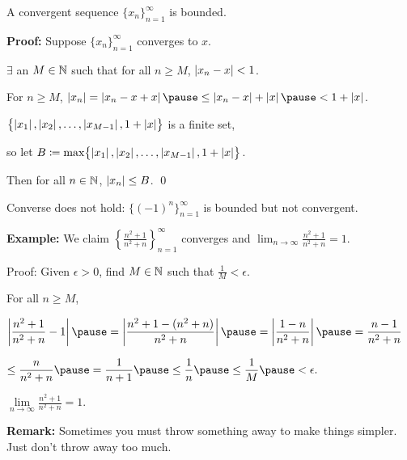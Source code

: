 \documentclass[10pt,aspectratio=149]{beamer}
\begin{document}
\begin{frame}

\begin{proposition}
A convergent sequence $\{ x_n \}_{n=1}^\infty$ is bounded.
\end{proposition}

\pause

\textbf{Proof:}
Suppose $\{ x_n \}_{n=1}^\infty$ converges to $x$.

\pause
\thus \quad $\exists$ an $M \in {\mathbb{N}}$ such that for all $n \geq M$,\quad
$\left\lvert {x_n - x} \right\rvert < 1$.

\medskip
\pause

For $n \geq M$, \quad
$\abs{x_n} = \abs{x_n - x + x} \pause
\leq \abs{x_n - x} + \abs{x} \pause
< 1 + \abs{x}$.

\medskip
\pause

$\bigl\{ \left\lvert {x_1} \right\rvert, \left\lvert {x_2} \right\rvert, \ldots, \left\lvert {x_{M-1}} \right\rvert, 1+\left\lvert {x} \right\rvert \bigr\}$
is a finite set,

so let
\quad $B \coloneqq \max \bigl\{ \left\lvert {x_1} \right\rvert, \left\lvert {x_2} \right\rvert, \ldots, \left\lvert {x_{M-1}} \right\rvert, 1+\left\lvert {x} \right\rvert \bigr\}$.

\medskip
\pause

Then for all $n \in {\mathbb{N}}$, \quad $\left\lvert {x_n} \right\rvert \leq B$.
\qed

\medskip
\pause

Converse does not hold: $\{ {(-1)}^n \}_{n=1}^\infty$ is bounded but not convergent.

\end{frame}

\begin{frame}


\textbf{Example:}
We claim $\left\{ \frac{n^2+1}{n^2+n} \right\}_{n=1}^\infty$ converges and
\quad $\displaystyle \lim_{n\to\infty} \frac{n^2+1}{n^2+n} = 1$.

\medskip
\pause

Proof:
Given $\epsilon > 0$, find $M \in {\mathbb{N}}$ such that $\frac{1}{M} < \epsilon$.

\medskip
\pause

For all $n \geq M$,

\medskip

\qquad
$\displaystyle
\abs{\frac{n^2+1}{n^2+n} - 1}  \pause = \abs{\frac{n^2+1 - (n^2+n)}{n^2+n}}
\pause
=
\abs{\frac{1 - n}{n^2+n}}
\pause
=
\frac{n-1}{n^2+n}
$

\medskip
\pause

\hfill
$\displaystyle
\leq 
\frac{n}{n^2+n} 
\pause
 =
\frac{1}{n+1}
\pause
\leq \frac{1}{n}
\pause
\leq \frac{1}{M}
\pause < \epsilon .
$\qquad

\medskip
\pause

\thus \quad
$\lim\limits_{n\to\infty} \frac{n^2+1}{n^2+n} = 1$.

\medskip
\pause

\textbf{Remark:} Sometimes you must throw something away
to make things simpler.
\pause
Just don't throw away too much.

\end{frame}
\end{document}
